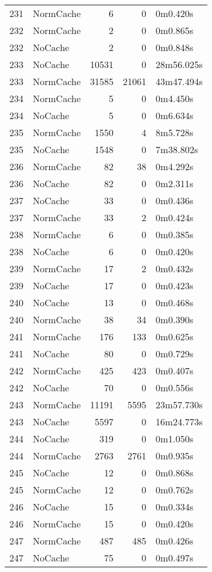 \begin{tabular}{llrrl}
231 & NormCache & 6 & 0 & 0m0.420s \\
232 & NormCache & 2 & 0 & 0m0.865s \\
232 & NoCache & 2 & 0 & 0m0.848s \\
233 & NoCache & 10531 & 0 & 28m56.025s \\
233 & NormCache & 31585 & 21061 & 43m47.494s \\
234 & NormCache & 5 & 0 & 0m4.450s \\
234 & NoCache & 5 & 0 & 0m6.634s \\
235 & NormCache & 1550 & 4 & 8m5.728s \\
235 & NoCache & 1548 & 0 & 7m38.802s \\
236 & NormCache & 82 & 38 & 0m4.292s \\
236 & NoCache & 82 & 0 & 0m2.311s \\
237 & NoCache & 33 & 0 & 0m0.436s \\
237 & NormCache & 33 & 2 & 0m0.424s \\
238 & NormCache & 6 & 0 & 0m0.385s \\
238 & NoCache & 6 & 0 & 0m0.420s \\
239 & NormCache & 17 & 2 & 0m0.432s \\
239 & NoCache & 17 & 0 & 0m0.423s \\
240 & NoCache & 13 & 0 & 0m0.468s \\
240 & NormCache & 38 & 34 & 0m0.390s \\
241 & NormCache & 176 & 133 & 0m0.625s \\
241 & NoCache & 80 & 0 & 0m0.729s \\
242 & NormCache & 425 & 423 & 0m0.407s \\
242 & NoCache & 70 & 0 & 0m0.556s \\
243 & NormCache & 11191 & 5595 & 23m57.730s \\
243 & NoCache & 5597 & 0 & 16m24.773s \\
244 & NoCache & 319 & 0 & 0m1.050s \\
244 & NormCache & 2763 & 2761 & 0m0.935s \\
245 & NoCache & 12 & 0 & 0m0.868s \\
245 & NormCache & 12 & 0 & 0m0.762s \\
246 & NoCache & 15 & 0 & 0m0.334s \\
246 & NormCache & 15 & 0 & 0m0.420s \\
247 & NormCache & 487 & 485 & 0m0.426s \\
247 & NoCache & 75 & 0 & 0m0.497s \\

\end{tabular}
